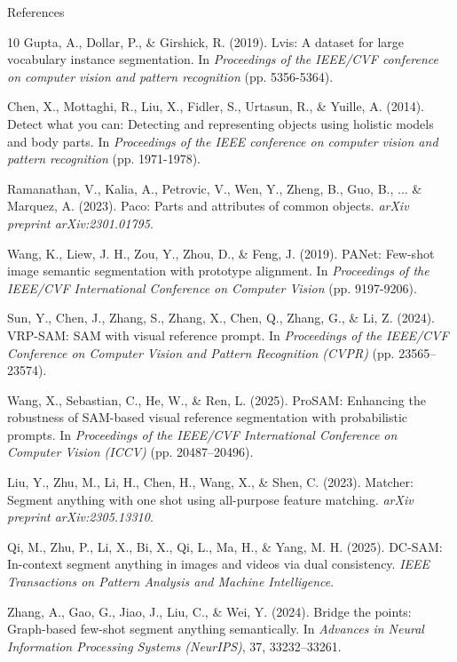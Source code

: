 \documentclass[aspectratio=169, 10pt]{beamer}
\begin{document}
\begin{frame}[allowframebreaks]{References}
\begin{thebibliography}{10}
Gupta, A., Dollar, P., \& Girshick, R. (2019). Lvis: A dataset for large vocabulary instance segmentation. In \textit{Proceedings of the IEEE/CVF conference on computer vision and pattern recognition} (pp. 5356-5364).

Chen, X., Mottaghi, R., Liu, X., Fidler, S., Urtasun, R., \& Yuille, A. (2014). Detect what you can: Detecting and representing objects using holistic models and body parts. In \textit{Proceedings of the IEEE conference on computer vision and pattern recognition} (pp. 1971-1978).

Ramanathan, V., Kalia, A., Petrovic, V., Wen, Y., Zheng, B., Guo, B., ... \& Marquez, A. (2023). Paco: Parts and attributes of common objects. \textit{arXiv preprint arXiv:2301.01795}.

Wang, K., Liew, J. H., Zou, Y., Zhou, D., \& Feng, J. (2019). PANet: Few-shot image semantic segmentation with prototype alignment. In \textit{Proceedings of the IEEE/CVF International Conference on Computer Vision} (pp. 9197-9206).

Sun, Y., Chen, J., Zhang, S., Zhang, X., Chen, Q., Zhang, G., \& Li, Z. (2024).
VRP-SAM: SAM with visual reference prompt.
In \textit{Proceedings of the IEEE/CVF Conference on Computer Vision and Pattern Recognition (CVPR)} (pp. 23565--23574).

Wang, X., Sebastian, C., He, W., \& Ren, L. (2025).
ProSAM: Enhancing the robustness of SAM-based visual reference segmentation with probabilistic prompts.
In \textit{Proceedings of the IEEE/CVF International Conference on Computer Vision (ICCV)} (pp. 20487--20496).

Liu, Y., Zhu, M., Li, H., Chen, H., Wang, X., \& Shen, C. (2023).
Matcher: Segment anything with one shot using all-purpose feature matching.
\textit{arXiv preprint arXiv:2305.13310}.

Qi, M., Zhu, P., Li, X., Bi, X., Qi, L., Ma, H., \& Yang, M. H. (2025).
DC-SAM: In-context segment anything in images and videos via dual consistency.
\textit{IEEE Transactions on Pattern Analysis and Machine Intelligence}.

Zhang, A., Gao, G., Jiao, J., Liu, C., \& Wei, Y. (2024).
Bridge the points: Graph-based few-shot segment anything semantically.
In \textit{Advances in Neural Information Processing Systems (NeurIPS)}, 37, 33232--33261.


\end{thebibliography}
\end{frame}
\end{document}
